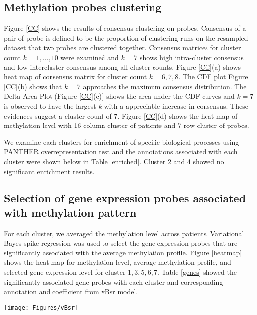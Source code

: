 \documentclass{article}
\begin{document}
\subsection{Methylation probes clustering}

Figure \ref{CC} shows the results of consensus clustering on probes. Consensus of a pair of probe is defined to be the proportion of clustering runs on the resampled dataset that two probes are clustered together. Consensus matrices for cluster count $k = 1, \dots, 10$ were examined and $k = 7$ shows high intra-cluster consensus and low intercluster consensus among all cluster counts. Figure \ref{CC}(a) shows heat map of consensus matrix for cluster count $k = 6, 7, 8$. The CDF plot Figure \ref{CC}(b) shows that $k = 7$ approaches the maximum consensus distribution. The Delta Area Plot (Figure \ref{CC}(c)) shows the area under the CDF curves and $k = 7$ is observed to have the largest $k$ with a appreciable increase in consensus. These evidences suggest a cluster count of 7. Figure \ref{CC}(d) shows the heat map of methylation level with 16 column cluster of patients and 7 row cluster of probes. 

We examine each clusters for enrichment of specific biological processes using PANTHER overrepresentation test \citep{mi2013large} and the annotations associated with each cluster were shown below in Table \ref{enriched}. Cluster 2 and 4 showed no significant enrichment results. 

\subsection{Selection of gene expression probes associated with methylation pattern}

For each cluster, we averaged the methylation level across patients. Variational Bayes spike regression was used to select the gene expression probes that are significantly associated with the average methylation profile. Figure \ref{heatmap} shows the heat map for methylation level, average methylation profile, and selected gene expression level for cluster $1, 3, 5, 6, 7$. Table \ref{genes} showed the significantly associated gene probes with each cluster and corresponding annotation and coefficient from vBsr model. 

\begin{figure*}[htb!]
\centering
\texttt{[image: Figures/vBsr]}
\caption{\textbf{Heat map of methylation level, average methylation level and gene expression probes significantly associate with average methylation level} For methylation cluster 1, 3, 5, 6, 7, the methylation level is shown. Methylation level within a cluster is averaged across the patients and served as response variable for vBsr model. The gene expression level of probes significantly associated with the methylation level was standardized and displayed as heat map as well. }
\label{heatmap}
\end{figure*}
\end{document}
